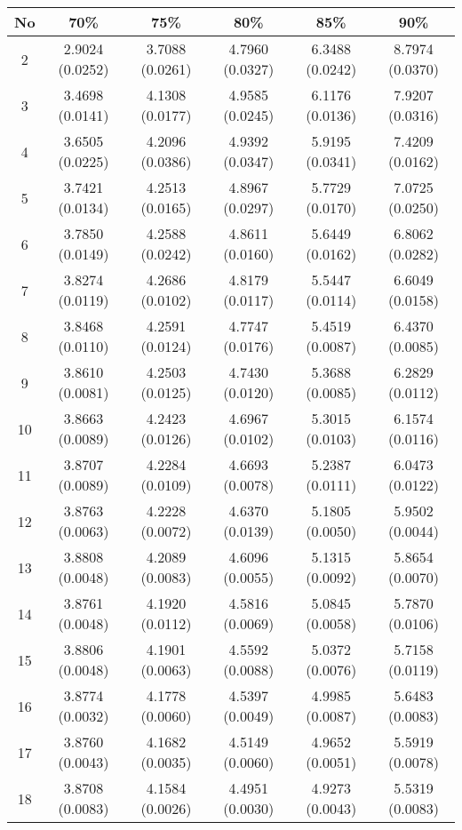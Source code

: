 \begin{table}[H]
\centering
\small
\begin{tabular}{c|c|c|c|c|c}
No  & 70\%            &75\%             &80\%             &85\%             &90\%\\
\hline
2   &2.9024 (0.0252)  &3.7088 (0.0261)  &4.7960 (0.0327)  &6.3488 (0.0242)  &8.7974 (0.0370)\\
3   &3.4698 (0.0141)  &4.1308 (0.0177)  &4.9585 (0.0245)  &6.1176 (0.0136)  &7.9207 (0.0316)\\
4   &3.6505 (0.0225)  &4.2096 (0.0386)  &4.9392 (0.0347)  &5.9195 (0.0341)  &7.4209 (0.0162)\\
5   &3.7421 (0.0134)  &4.2513 (0.0165)  &4.8967 (0.0297)  &5.7729 (0.0170)  &7.0725 (0.0250)\\
6   &3.7850 (0.0149)  &4.2588 (0.0242)  &4.8611 (0.0160)  &5.6449 (0.0162)  &6.8062 (0.0282)\\
7   &3.8274 (0.0119)  &4.2686 (0.0102)  &4.8179 (0.0117)  &5.5447 (0.0114)  &6.6049 (0.0158)\\
8   &3.8468 (0.0110)  &4.2591 (0.0124)  &4.7747 (0.0176)  &5.4519 (0.0087)  &6.4370 (0.0085)\\
9   &3.8610 (0.0081)  &4.2503 (0.0125)  &4.7430 (0.0120)  &5.3688 (0.0085)  &6.2829 (0.0112)\\
10  &3.8663 (0.0089)  &4.2423 (0.0126)  &4.6967 (0.0102)  &5.3015 (0.0103)  &6.1574 (0.0116)\\
11  &3.8707 (0.0089)  &4.2284 (0.0109)  &4.6693 (0.0078)  &5.2387 (0.0111)  &6.0473 (0.0122)\\
12  &3.8763 (0.0063)  &4.2228 (0.0072)  &4.6370 (0.0139)  &5.1805 (0.0050)  &5.9502 (0.0044)\\
13  &3.8808 (0.0048)  &4.2089 (0.0083)  &4.6096 (0.0055)  &5.1315 (0.0092)  &5.8654 (0.0070)\\
14  &3.8761 (0.0048)  &4.1920 (0.0112)  &4.5816 (0.0069)  &5.0845 (0.0058)  &5.7870 (0.0106)\\
15  &3.8806 (0.0048)  &4.1901 (0.0063)  &4.5592 (0.0088)  &5.0372 (0.0076)  &5.7158 (0.0119)\\
16  &3.8774 (0.0032)  &4.1778 (0.0060)  &4.5397 (0.0049)  &4.9985 (0.0087)  &5.6483 (0.0083)\\
17  &3.8760 (0.0043)  &4.1682 (0.0035)  &4.5149 (0.0060)  &4.9652 (0.0051)  &5.5919 (0.0078)\\
18  &3.8708 (0.0083)  &4.1584 (0.0026)  &4.4951 (0.0030)  &4.9273 (0.0043)  &5.5319 (0.0083)\\

\end{tabular}
\end{table}
